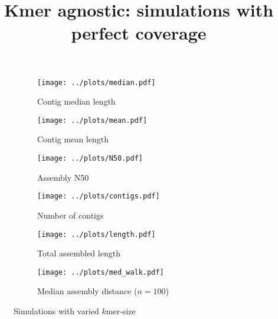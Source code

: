 \documentclass{article}
\title{Kmer agnostic: simulations with perfect coverage}
\begin{document}
\begin{figure}[ht]
\begin{subfigure}{.5\textwidth}
  \centering
  \caption{Contig median length}
  \texttt{[image: ../plots/median.pdf]}
\end{subfigure}
\begin{subfigure}{.5\textwidth}
  \centering
  \caption{Contig mean length}
  \texttt{[image: ../plots/mean.pdf]}
\end{subfigure}
\begin{subfigure}{.5\textwidth}
  \centering
  \caption{Assembly N50}
  \texttt{[image: ../plots/N50.pdf]}
\end{subfigure}
\begin{subfigure}{.5\textwidth}
  \centering
  \caption{Number of contigs}
  \texttt{[image: ../plots/contigs.pdf]}
\end{subfigure}
\begin{subfigure}{.5\textwidth}
  \centering
  \caption{Total assembled length}
  \texttt{[image: ../plots/length.pdf]}
\end{subfigure}
\begin{subfigure}{.5\textwidth}
  \centering
  \caption{Median assembly distance ($n=100$)}
  \texttt{[image: ../plots/med\_walk.pdf]}
\end{subfigure}
\caption{Simulations with varied $k$mer-size}
\label{fig:kmer_agnostic}
\end{figure}
\end{document}
